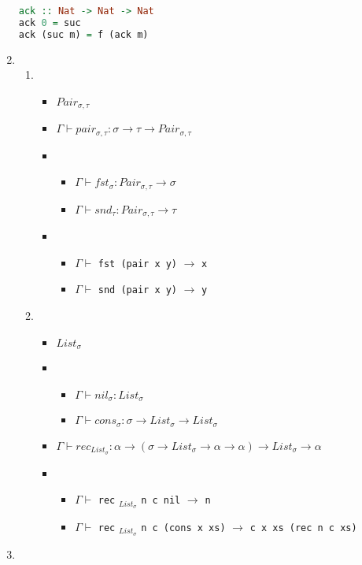 \documentclass[12pt,a4paper]{article}
\begin{document}
\begin{enumerate}
{\begin{enumerate}
{\begin{lstlisting}[language=Haskell]
ack :: Nat -> Nat -> Nat
ack 0 = suc
ack (suc m) = f (ack m)
			\end{lstlisting}
		}
	\end{enumerate}
}
\item {
	\begin{enumerate}
	\item {
		\begin{itemize}
			\item $Pair_{\sigma,\tau}$
			\item $\Gamma \vdash pair_{\sigma,\tau} \colon \sigma \rightarrow \tau \rightarrow Pair_{\sigma,\tau}$
			\item {
				\begin{itemize}
					\item $\Gamma \vdash fst_{\sigma} \colon Pair_{\sigma,\tau} \rightarrow \sigma$
					\item $\Gamma \vdash snd_{\tau} \colon Pair_{\sigma,\tau} \rightarrow \tau$
				\end{itemize}
			}
			\item {
				\begin{itemize}
					\item $\Gamma \vdash$ \texttt{fst (pair x y)} $\rightarrow$ \texttt{x}
					\item $\Gamma \vdash$ \texttt{snd (pair x y)} $\rightarrow$ \texttt{y}
				\end{itemize}
			}
		\end{itemize}
	}
	\item {
		\begin{itemize}
			\item $List_{\sigma}$
			\item {
				\begin{itemize}
					\item $\Gamma \vdash nil_{\sigma} \colon List_{\sigma}$
					\item $\Gamma \vdash cons_{\sigma} \colon \sigma \rightarrow List_{\sigma} \rightarrow List_{\sigma}$
				\end{itemize}
			}
			\item $\Gamma \vdash rec_{List_{\sigma}} \colon \alpha \rightarrow (\sigma \rightarrow List_{\sigma} \rightarrow \alpha \rightarrow \alpha) \rightarrow List_{\sigma} \rightarrow \alpha$
			\item {
				\begin{itemize}
					\item $\Gamma \vdash$ \texttt{rec} $_{List_{\sigma}}$ \texttt{n c nil} $\rightarrow$ \texttt{n}
					\item $\Gamma \vdash$ \texttt{rec} $_{List_{\sigma}}$ \texttt{n c (cons x xs)} $\rightarrow$ \texttt{c x xs (rec n c xs)}
				\end{itemize}
			}
		\end{itemize}
	}
	\end{enumerate}
}
\item

\end{enumerate}
\end{document}
